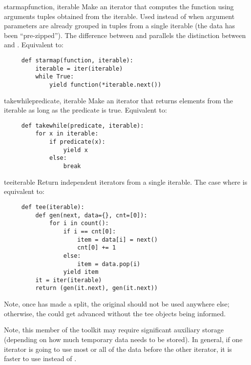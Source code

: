\begin{funcdesc}{starmap}{function, iterable}
  Make an iterator that computes the function using arguments tuples
  obtained from the iterable.  Used instead of  when
  argument parameters are already grouped in tuples from a single iterable
  (the data has been ``pre-zipped'').  The difference between
   and  parallels the distinction
  between  and .
  Equivalent to:

  \begin{verbatim}
     def starmap(function, iterable):
         iterable = iter(iterable)
         while True:
             yield function(*iterable.next())
  \end{verbatim}
\end{funcdesc}

\begin{funcdesc}{takewhile}{predicate, iterable}
  Make an iterator that returns elements from the iterable as long as
  the predicate is true.  Equivalent to:

  \begin{verbatim}
     def takewhile(predicate, iterable):
         for x in iterable:
             if predicate(x):
                 yield x
             else:
                 break
  \end{verbatim}
\end{funcdesc}

\begin{funcdesc}{tee}{iterable}
  Return  independent iterators from a single iterable.
  The case where  is equivalent to:

  \begin{verbatim}
     def tee(iterable):
         def gen(next, data={}, cnt=[0]):
             for i in count():
                 if i == cnt[0]:
                     item = data[i] = next()
                     cnt[0] += 1
                 else:
                     item = data.pop(i)
                 yield item
         it = iter(iterable)
         return (gen(it.next), gen(it.next))
  \end{verbatim}

  Note, once  has made a split, the original 
  should not be used anywhere else; otherwise, the  could get
  advanced without the tee objects being informed.

  Note, this member of the toolkit may require significant auxiliary
  storage (depending on how much temporary data needs to be stored).
  In general, if one iterator is going to use most or all of the data before
  the other iterator, it is faster to use  instead of
  .
\end{funcdesc}


